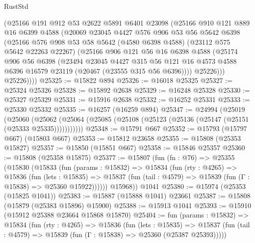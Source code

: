 \begin{lexlean}{RustStd}
\begin{coremodule}
        (@25166
          @191
          @912
          @53
          @2622
          @5891
          @6401
          @23098
          (@25166
            @910
            @121
            @889
            @16
            @6399
            @4588
            (@20069
              @23045
              @4427
              @576
              @906
              @53
              @56
              @5642
              @6398
              (@25166
                @576
                @908
                @53
                @58
                @5642
                (@4580 @6398 @4588)
                (@23112 @575 @5642 @22263 @22267)
                (@25166
                  @906
                  @121
                  @56
                  @16
                  @6398
                  @4588
                  (@25174
                    @906
                    @56
                    @6398
                    (@23494
                      @23045
                      @4427
                      @315
                      @56
                      @121
                      @16
                      @4573
                      @4588
                      @6396
                      @16579
                      @23119
                      (@20467 (@23555 @315 @56 @6396))))
                  @25226)))
            @25226))))
@25325 := @15822 @894
@25326 := @16018 @25325
@25327 := @25324 @25326
@25328 := @15892 @2638
@25329 := @16248 @25328
@25330 := @25327 @25329
@25331 := @15916 @2638
@25332 := @16252 @25331
@25333 := @25330 @25332
@25335 := @16257 (@16259 @894)
@25347 := @24994
    (@25019
      (@25060
        (@25062 (@25064 (@25085 (@25108 (@25123 (@25136 (@25147 (@25151 (@25333 @25335)))))))))))
@25348 := @15791 @667
@25352 := @15793 (@15797 @667) (@15803 @667)
@25353 := @15812 @23658
@25355 := @15808 (@25353 @15827)
@25357 := @15850 (@15851 @667)
@25358 := @15846 @25357
@25360 := @15808 (@25358 @15875)
@25377 := @15807
    (fun (fn : @76) =>
    @25355
      (@15830
        (@15833
          (fun (params : @15832) =>
          @15834
            (fun (rty : @4265) =>
            @15836
              (fun (lets : @15835) =>
              @15837 (fun (tail : @4579) => @15839 (fun (Γ : @15838) => @25360 @15922))))))
        @15968))
    @1041
@25380 := @15974 (@25353 (@15825 @1041))
@25383 := @15887 (@15888 @1041) @23661
@25387 := @15808 (@15879 (@25383 @15896) @15900)
@25388 := @15913 @1041
@25393 := @15910 (@15912 @25388 @23664 @15868 @15870)
@25404 := fun (params : @15832) =>
  @15834
    (fun (rty : @4265) =>
    @15836
      (fun (lets : @15835) =>
      @15837 (fun (tail : @4579) => @15839 (fun (Γ : @15838) => @25360 (@25387 @25393)))))

\end{coremodule}
\end{lexlean}
